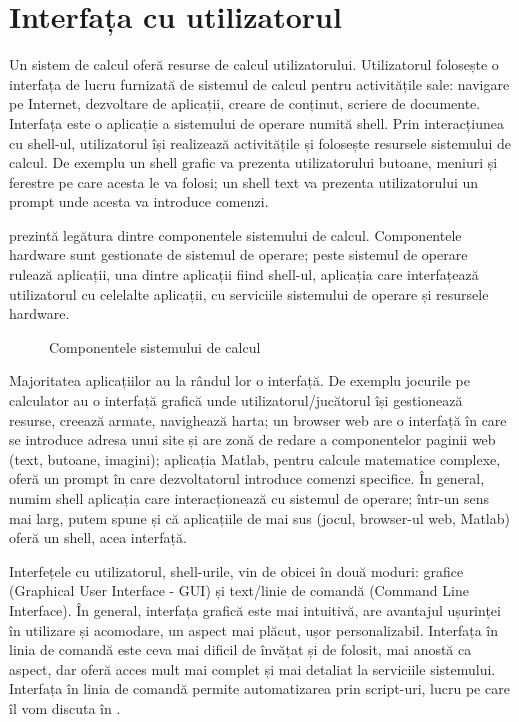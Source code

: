 \chapter{Interfața cu utilizatorul}
\label{chapter:ui}

Un sistem de calcul oferă resurse de calcul utilizatorului. Utilizatorul folosește o interfața de lucru furnizată de sistemul de calcul pentru activitățile sale: navigare pe Internet, dezvoltare de aplicații, creare de conținut, scriere de documente. Interfața este o aplicație a sistemului de operare numită shell. Prin interacțiunea cu shell-ul, utilizatorul își realizează activitățile și folosește resursele sistemului de calcul. De exemplu un shell grafic va prezenta utilizatorului butoane, meniuri și ferestre pe care acesta le va folosi; un shell text va prezenta utilizatorului un prompt unde acesta va introduce comenzi.

 prezintă legătura dintre componentele sistemului de calcul. Componentele hardware sunt gestionate de sistemul de operare; peste sistemul de operare rulează aplicații, una dintre aplicații fiind shell-ul, aplicația care interfațează utilizatorul cu celelalte aplicații, cu serviciile sistemului de operare și resursele hardware.

\begin{figure}[htbp]
  \centering
  \def\svgwidth{\columnwidth}
  
  \caption{Componentele sistemului de calcul}
  \label{fig:ui:system-components}
\end{figure}

Majoritatea aplicațiilor au la rândul lor o interfață. De exemplu jocurile pe calculator au o interfață grafică unde utilizatorul/jucătorul își gestionează resurse, creează armate, navighează harta; un browser web are o interfață în care se introduce adresa unui site și are zonă de redare a componentelor paginii web (text, butoane, imagini); aplicația Matlab, pentru calcule matematice complexe, oferă un prompt în care dezvoltatorul introduce comenzi specifice. În general, numim shell aplicația care interacționează cu sistemul de operare; într-un sens mai larg, putem spune și că aplicațiile de mai sus (jocul, browser-ul web, Matlab) oferă un shell, acea interfață.

Interfețele cu utilizatorul, shell-urile, vin de obicei în două moduri: grafice (Graphical User Interface - GUI) și text/linie de comandă (Command Line Interface). În general, interfața grafică este mai intuitivă, are avantajul ușurinței în utilizare și acomodare, un aspect mai plăcut, ușor personalizabil. Interfața în linia de comandă este ceva mai dificil de învățat și de folosit, mai anostă ca aspect, dar oferă acces mult mai complet și mai detaliat la serviciile sistemului. Interfața în linia de comandă permite automatizarea prin script-uri, lucru pe care îl vom discuta în .

